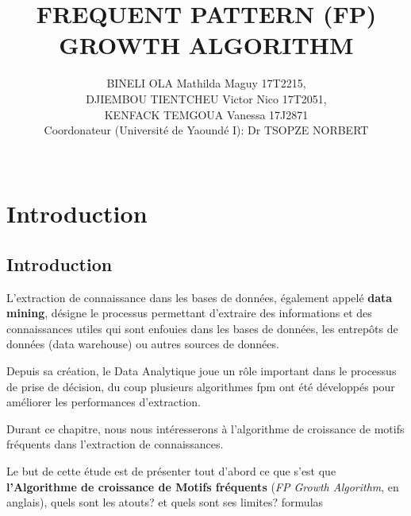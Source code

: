 \documentclass[a4paper,twoside,12pt]{report}   	%
\title{ FREQUENT PATTERN (FP) GROWTH ALGORITHM}
\author{BINELI OLA Mathilda Maguy 17T2215,\\ DJIEMBOU TIENTCHEU Victor Nico 17T2051,\\KENFACK TEMGOUA Vanessa 17J2871\\Coordonateur (Université de Yaoundé I): Dr TSOPZE NORBERT\\ \ \ \ \ }
\begin{document}

\maketitle


\newpage

\tableofcontents
\listoftables
\listoffigures  %

\newpage
{}


\chapter{Introduction}
\label{chapitre introductif}

\section{Introduction}
\par L'extraction de connaissance dans les bases de données, également appelé \textbf{data mining}, désigne le processus permettant d'extraire des informations et des connaissances utiles qui sont enfouies dans les bases de données, les entrepôts de données (data warehouse) ou autres sources de données.
\par Depuis sa création, le Data Analytique joue un rôle important dans le processus de prise de décision, du coup plusieurs algorithmes \acrfull{fpm} ont été développés pour améliorer les performances d'extraction.
\par Durant ce chapitre, nous nous intéresserons à l'algorithme de croissance de motifs fréquents dans l'extraction de connaissances.
\par Le but de cette étude est de présenter tout d'abord ce que s'est que \textbf{l'Algorithme de croissance de Motifs fréquents} (\textit{FP Growth Algorithm}, en anglais), quels sont les atouts? et quels sont ses limites?
\Glspl{formula}
\end{document}
